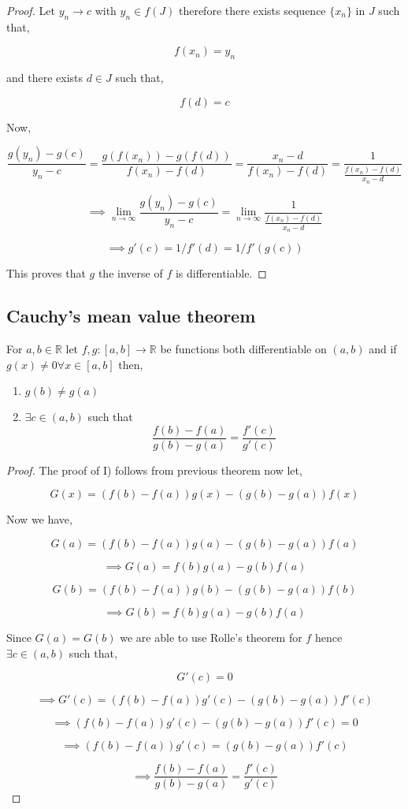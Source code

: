 \documentclass[11pt,a4paper]{colorart}
\def\R{\mathbb{R}}
\def\ra{\rightarrow}
\begin{document}
\begin{proof}
	Let $y_n \ra c$ with $y_n \in f(J)$ therefore there exists sequence $\{x_n\}$ in $J$ such that,

	\[ f(x_n) = y_n \]

	and there exists $d \in J$ such that,

	\[ f(d) = c \]

	Now,

	\[ \frac{ g(y_n) - g(c) }{ y_n - c } = \frac{ g(f(x_n)) - g(f(d)) }{ f(x_n) - f(d) } = \frac{ x_n - d }{ f(x_n) - f(d) } = \frac{1}{\frac{ f(x_n) - f(d) }{ x_n - d }} \]
	
	\[ \implies \lim_{n \ra \infty} \frac{ g(y_n) - g(c) }{ y_n - c } = \lim_{n \ra \infty} \frac{1}{\frac{ f(x_n) - f(d) }{ x_n - d }} \]
	
	\[ \implies g'(c) = 1/f'(d) = 1/f'(g(c)) \]

	This proves that $g$ the inverse of $f$ is differentiable.

\end{proof}

\subsection{ Cauchy's mean value theorem }

\begin{theorem}

	For $a,b \in \R$ let $f,g: [a,b] \ra \R$ be functions both differentiable on $(a,b)$ and if $g(x) \neq 0 \forall x\in [a,b]$ then,
	\begin{enumerate}
		\item $g(b) \neq g(a)$
		\item $\exists c \in (a,b)$ such that
			\[ \frac{ f(b) - f(a) }{ g(b) - g(a) } = \frac{ f'(c) }{ g'(c) } \]
	\end{enumerate}
\end{theorem}

\begin{proof}

	The proof of I) follows from previous theorem now let,

	\[ G(x) = (f(b)-f(a))g(x) - (g(b)-g(a))f(x) \]
	
	Now we have,

	\[ G(a) = (f(b)-f(a))g(a) - (g(b)-g(a))f(a) \]
	
	\[ \implies G(a) = f(b)g(a) - g(b)f(a) \]

	\[ G(b) = (f(b)-f(a))g(b) - (g(b)-g(a))f(b) \]
	
	\[ \implies G(b) = f(b)g(a) - g(b)f(a) \]

	Since $G(a) = G(b)$ we are able to use Rolle's theorem for $f$ hence $\exists c \in (a,b)$ such that,

	\[ G'(c) = 0 \]
	
	\[ \implies G'(c) = (f(b)-f(a))g'(c) - (g(b)-g(a))f'(c) \]
	
	\[ \implies (f(b)-f(a))g'(c) - (g(b)-g(a))f'(c) = 0 \]

	\[ \implies (f(b)-f(a))g'(c) = (g(b)-g(a))f'(c) \]

	\[ \implies \frac{ f(b) - f(a) }{ g(b) - g(a) } = \frac{ f'(c) }{ g'(c) } \]

\end{proof}
\end{document}

